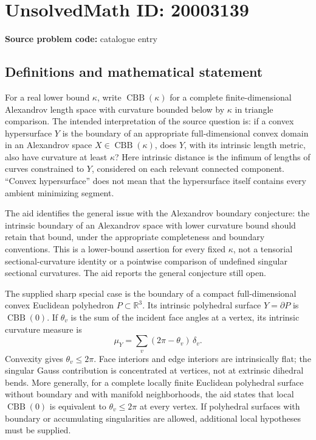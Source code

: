 \documentclass[11pt]{article}
\newcommand{\R}{\mathbb{R}}
\begin{document}
\section*{UnsolvedMath ID: 20003139}
\textbf{Source problem code:} catalogue entry
\subsection{Definitions and mathematical statement}
For a real lower bound $\kappa$, write $\operatorname{CBB}(\kappa)$ for a complete finite-dimensional Alexandrov length space with curvature bounded below by $\kappa$ in triangle comparison. The intended interpretation of the source question is: if a convex hypersurface $Y$ is the boundary of an appropriate full-dimensional convex domain in an Alexandrov space $X\in\operatorname{CBB}(\kappa)$, does $Y$, with its intrinsic length metric, also have curvature at least $\kappa$? Here intrinsic distance is the infimum of lengths of curves constrained to $Y$, considered on each relevant connected component. ``Convex hypersurface'' does not mean that the hypersurface itself contains every ambient minimizing segment.

The aid identifies the general issue with the Alexandrov boundary conjecture: the intrinsic boundary of an Alexandrov space with lower curvature bound should retain that bound, under the appropriate completeness and boundary conventions. This is a lower-bound assertion for every fixed $\kappa$, not a tensorial sectional-curvature identity or a pointwise comparison of undefined singular sectional curvatures. The aid reports the general conjecture still open.

The supplied sharp special case is the boundary of a compact full-dimensional convex Euclidean polyhedron $P\subset\R^3$. Its intrinsic polyhedral surface $Y=\partial P$ is $\operatorname{CBB}(0)$. If $\theta_v$ is the sum of the incident face angles at a vertex, its intrinsic curvature measure is
\[
 \mu_Y=\sum_{v}(2\pi-\theta_v)\,\delta_v.
\]
Convexity gives $\theta_v\leq2\pi$. Face interiors and edge interiors are intrinsically flat; the singular Gauss contribution is concentrated at vertices, not at extrinsic dihedral bends. More generally, for a complete locally finite Euclidean polyhedral surface without boundary and with manifold neighborhoods, the aid states that local $\operatorname{CBB}(0)$ is equivalent to $\theta_v\leq2\pi$ at every vertex. If polyhedral surfaces with boundary or accumulating singularities are allowed, additional local hypotheses must be supplied.
\end{document}
